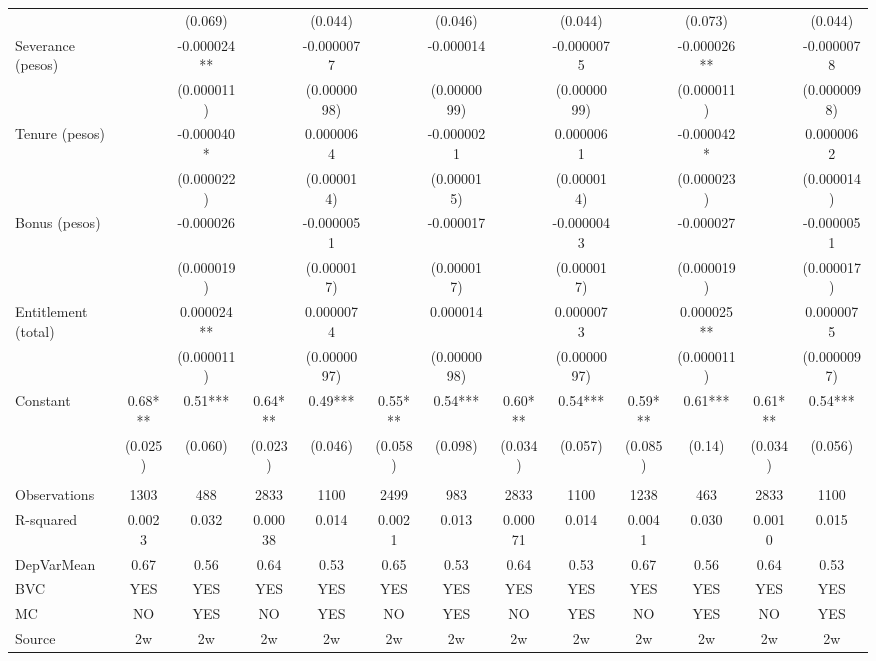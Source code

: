 \begin{tabular}{lcccccccccccc}
      &       & (0.069) &       & (0.044) &       & (0.046) &       & (0.044) &       & (0.073) &       & (0.044) \\
Severance (pesos) &       & -0.000024** &       & -0.0000077 &       & -0.000014 &       & -0.0000075 &       & -0.000026** &       & -0.0000078 \\
      &       & (0.000011) &       & (0.0000098) &       & (0.0000099) &       & (0.0000099) &       & (0.000011) &       & (0.0000098) \\
Tenure (pesos) &       & -0.000040* &       & 0.0000064 &       & -0.0000021 &       & 0.0000061 &       & -0.000042* &       & 0.0000062 \\
      &       & (0.000022) &       & (0.000014) &       & (0.000015) &       & (0.000014) &       & (0.000023) &       & (0.000014) \\
Bonus (pesos) &       & -0.000026 &       & -0.0000051 &       & -0.000017 &       & -0.0000043 &       & -0.000027 &       & -0.0000051 \\
      &       & (0.000019) &       & (0.000017) &       & (0.000017) &       & (0.000017) &       & (0.000019) &       & (0.000017) \\
Entitlement (total) &       & 0.000024** &       & 0.0000074 &       & 0.000014 &       & 0.0000073 &       & 0.000025** &       & 0.0000075 \\
      &       & (0.000011) &       & (0.0000097) &       & (0.0000098) &       & (0.0000097) &       & (0.000011) &       & (0.0000097) \\
Constant & 0.68*** & 0.51*** & 0.64*** & 0.49*** & 0.55*** & 0.54*** & 0.60*** & 0.54*** & 0.59*** & 0.61*** & 0.61*** & 0.54*** \\
      & (0.025) & (0.060) & (0.023) & (0.046) & (0.058) & (0.098) & (0.034) & (0.057) & (0.085) & (0.14) & (0.034) & (0.056) \\
      &       &       &       &       &       &       &       &       &       &       &       &  \\
\midrule
Observations & 1303  & 488   & 2833  & 1100  & 2499  & 983   & 2833  & 1100  & 1238  & 463   & 2833  & 1100 \\
R-squared & 0.0023 & 0.032 & 0.00038 & 0.014 & 0.0021 & 0.013 & 0.00071 & 0.014 & 0.0041 & 0.030 & 0.0010 & 0.015 \\
DepVarMean & 0.67  & 0.56  & 0.64  & 0.53  & 0.65  & 0.53  & 0.64  & 0.53  & 0.67  & 0.56  & 0.64  & 0.53 \\
BVC   & YES   & YES   & YES   & YES   & YES   & YES   & YES   & YES   & YES   & YES   & YES   & YES \\
MC    & NO    & YES   & NO    & YES   & NO    & YES   & NO    & YES   & NO    & YES   & NO    & YES \\
Source & 2w    & 2w    & 2w    & 2w    & 2w    & 2w    & 2w    & 2w    & 2w    & 2w    & 2w    & 2w \\
\bottomrule
\bottomrule
\end{tabular}%
